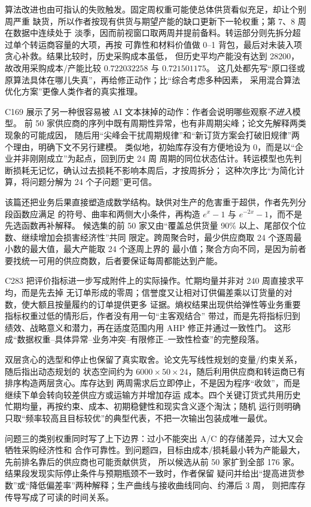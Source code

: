 算法改进也由可指认的失败触发。固定周权重可能使总体供货看似充足，却让个别周严重
缺货，所以作者按现有供货与期望产能的缺口更新下一轮权重；第 7、8 周在数据中连续处于
淡季，因而前视窗口取两周并提前备料。转运部分则先拆分超过单个转运商容量的大项，再按
可靠性和材料价值做 0--1 背包，最后对未装入项贪心补救。结果比较时，历史采购成本虽低，
但历史平均产能没有达到 28200，故改用采购成本/产能比较 $0.722032258$ 与 $0.721501175$。
这几处都先写“原口径或原算法具体在哪儿失真”，再给修正动作；比“综合考虑多种因素，
采用混合算法优化方案”更像人类作者的真实推理。

C169 展示了另一种很容易被 AI 文本抹掉的动作：作者会说明哪些观察\emph{不进入}模型。
前 50 家供应商的序列中既有周期性异常，也有非周期尖峰；论文先解释两类现象的可能成因，
随后用“尖峰会干扰周期规律”和“新订货方案会打破旧规律”两个理由，明确下文不另行建模。
类似地，初始库存没有方便地设为 0，而是以“企业并非刚刚成立”为起点，回到历史 24 周
周期的同位状态估计。转运模型也先判断损耗无记忆，确认过去损耗不影响本周后，才按周拆分；
这种次序比“为简化计算，将问题分解为 24 个子问题”更可信。

该篇还把业务后果直接塑造成数学结构。缺供对生产的危害重于超供，作者先列分段函数应满足
的符号、曲率和两侧大小条件，再构造 $e^x-1$ 与 $e^{-2x}-1$，而不是先选函数再补解释。
候选集的前 50 家又由“覆盖总供货量 90\% 以上、尾部仅个位数、继续增加会损害经济性”共同
限定。跨周聚合时，最少供应商取 24 个逐周最小数的最大值，最大产能取 24 个逐周上界的
最小值；聚合方向不同，是因为前者要找统一可用的供应商数，后者要保证每周都能达到产能。

C283 把评价指标进一步写成附件上的实际操作。忙期均量并非对 240 周直接求平均，而是先去掉
无订单形成的零周；信誉度又让相对订供偏差乘以订货量的对数，使大额且按量履约的订单提供更多
证据。熵权结果出现供给弹性等业务重要指标权重过低的情形后，作者没有用一句“主客观结合”
带过，而是先将指标归到绩效、战略意义和潜力，再在适度范围内用 AHP 修正并通过一致性门。
这形成“数据权重--具体异常--业务冲突--有限修正--一致性检查”的完整段落。

双层贪心的选型和停止也保留了真实取舍。论文先写线性规划的变量/约束关系，随后指出动态规划的
状态空间约为 $6000\times50\times24$，随后利用供应商和转运商已有排序构造两层贪心。库存达到
两周需求后立即停止，不是因为程序“收敛”，而是继续下单会转向较差供应方或运输方并增加存运
成本。四个关键订货式共用历史忙期均量，再按约束、成本、初期稳健性和现实含义逐个淘汰；随机
运行则明确只取“频率较高且目标较优”的典型代表，不把一次输出包装成唯一最优。

问题三的类别权重同时写了上下边界：过小不能突出 A/C 的存储差异，过大又会牺牲采购经济性和
合作可靠性。到问题四，目标由成本/损耗最小转为产能最大，先前排名靠后的供应商也可能贡献供货，
所以候选从前 50 家扩到全部 176 家。结果段发现实际停止条件与预期瓶颈不一致时，作者保留
疑问并给出“提高进货参数”或“降低偏差率”两种解释；生产曲线与接收曲线同向、约滞后 3 周，
则把库存传导写成了可读的时间关系。

